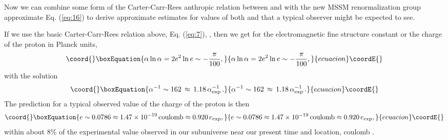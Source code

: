 \documentclass[a4paper,12pt]{article}
\begin{document}
	Now we can combine some form of the Carter-Carr-Rees
anthropic relation between \myHighlight{$\alpha$}\coordHE{} and \coordHE{}
with the new MSSM renormalization group approximate
Eq. (\ref{eq:16}) to derive approximate estimates for values of both
\myHighlight{$\alpha$}\coordHE{} and \coordHE{} that a typical observer might be expected
to see.

	If we use the basic Carter-Carr-Rees relation above,
Eq. (\ref{eq:7}), \coordHE{},
then we get for the electromagnetic fine structure constant \myHighlight{$\alpha$}\coordHE{}
or the charge \coordHE{} of the proton in Planck units,
 \begin{equation}\coord{}\boxEquation{
 \alpha\ln{\alpha} = 2 e^2\ln{e} \sim -{\pi\over 100},
 \label{eq:21}
 }{
 \alpha\ln{\alpha} = 2 e^2\ln{e} \sim -{\pi\over 100},
 }{ecuacion}\coordE{}\end{equation}
with the solution
 \begin{equation}\coord{}\boxEquation{
 \alpha^{-1} \sim 162 \, \approx \, 1.18\,\alpha_{\mathrm{exp}}^{-1}\,.
 \label{eq:22}
 }{
 \alpha^{-1} \sim 162 \, \approx \, 1.18\,\alpha_{\mathrm{exp}}^{-1}\,.
 }{ecuacion}\coordE{}\end{equation}
The prediction for a typical observed value of the charge
of the proton is then
 \begin{equation}\coord{}\boxEquation{
 e \sim 0.0786 \approx 1.47 \times 10^{-19} \, \mathrm{coulomb}
   \approx 0.920 \, e_{\mathrm{exp}},
 \label{eq:24}
 }{
 e \sim 0.0786 \approx 1.47 \times 10^{-19} \, \mathrm{coulomb}
   \approx 0.920 \, e_{\mathrm{exp}},
 }{ecuacion}\coordE{}\end{equation}
within about 8\% of the experimental value
observed in our subuniverse near our present time and location,
\coordHE{} coulomb \cite{PDG}.
   
\end{document}
